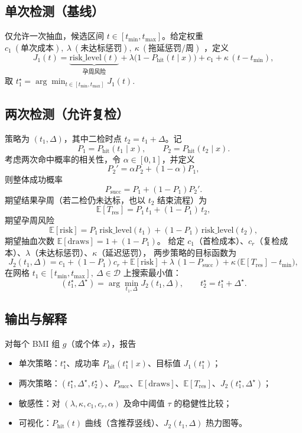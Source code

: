 \documentclass[11pt,a4paper]{article}
\begin{document}
\subsection{单次检测（基线）}
仅允许一次抽血，候选区间 $t\in[t_{\min},t_{\max}]$。给定权重
\(
c_1\ (\text{单次成本}),\ \lambda\ (\text{未达标惩罚}),\ \kappa\ (\text{拖延惩罚/周})
\)
，定义
\[
  J_1(t)=\underbrace{\text{risk\_level}(t)}_{\text{孕周风险}}
       +\lambda\bigl(1-P_{\text{hit}}(t\mid x)\bigr)
       +c_1+\kappa\,(t-t_{\min}),
\]
取
\(
  t_1^\star=\arg\min_{t\in[t_{\min},t_{\max}]} J_1(t).
\)

\subsection{两次检测（允许复检）}
策略为 $(t_1,\Delta)$，其中二检时点 $t_2=t_1+\Delta$。记
\[
  P_1=P_{\text{hit}}(t_1\mid x),\qquad
  P_2=P_{\text{hit}}(t_2\mid x).
\]
考虑两次命中概率的相关性，令 $\alpha\in[0,1]$，并定义
\[
  P_2'=\alpha P_2+(1-\alpha)P_1,
\]
则整体成功概率
\[
  P_{\text{succ}}=P_1+(1-P_1)P_2'.
\]
期望结果孕周（若二检仍未达标，也以 $t_2$ 结束流程）为
\[
  \mathbb{E}[T_{\text{res}}]=P_1\,t_1+(1-P_1)\,t_2,
\]
期望孕周风险
\[
  \mathbb{E}[\text{risk}]=P_1\,\text{risk\_level}(t_1)+(1-P_1)\,\text{risk\_level}(t_2),
\]
期望抽血次数 $\mathbb{E}[\text{draws}]=1+(1-P_1)$。
给定 $c_1$（首检成本）、$c_r$（复检成本）、$\lambda$（未达标惩罚）、$\kappa$（延迟惩罚），
两步策略的目标函数为
\[
  J_2(t_1,\Delta)=
  c_1 + (1-P_1)c_r
  + \mathbb{E}[\text{risk}]
  + \lambda\,(1-P_{\text{succ}})
  + \kappa\,\bigl(\mathbb{E}[T_{\text{res}}]-t_{\min}\bigr),
\]
在网格
\(
t_1\in[t_{\min},t_{\max}],\ \Delta\in\mathcal{D}
\)
上搜索最小值：
\[
  (t_1^\star,\Delta^\star)=\arg\min_{t_1,\Delta} J_2(t_1,\Delta),\qquad
  t_2^\star=t_1^\star+\Delta^\star.
\]

\subsection{输出与解释}
对每个 BMI 组 $g$（或个体 $x$），报告
\begin{itemize}
  \item 单次策略：$t_1^\star$、成功率 $P_{\text{hit}}(t_1^\star\mid x)$、目标值 $J_1(t_1^\star)$；
  \item 两次策略：$(t_1^\star,\Delta^\star,t_2^\star)$、$P_{\text{succ}}$、$\mathbb{E}[\text{draws}]$、$\mathbb{E}[T_{\text{res}}]$、$J_2(t_1^\star,\Delta^\star)$；
  \item 敏感性：对 $(\lambda,\kappa,c_1,c_r,\alpha)$ 及命中阈值 $\tau$ 的稳健性比较；
  \item 可视化：$P_{\text{hit}}(t)$ 曲线（含推荐竖线）、$J_2(t_1,\Delta)$ 热力图等。
\end{itemize}
\end{document}
